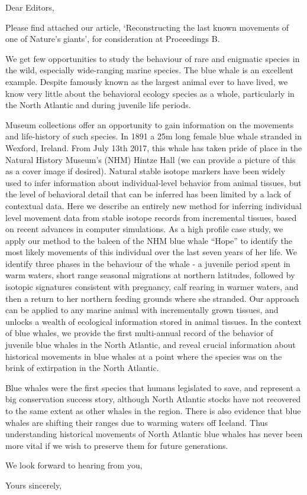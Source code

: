 \documentclass[11pt]{letter}
\begin{document}
\begin{letter}{}
\opening{Dear Editors,}

Please find attached our article, `Reconstructing the last known movements of one of Nature's giants', for consideration at Proceedings B.

We get few opportunities to study the behaviour of rare and enigmatic species in the wild, especially wide-ranging marine species. 
The blue whale is an excellent example. 
Despite famously known as the largest animal ever to have lived, we know very little about the behavioral ecology species as a whole, particularly in the North Atlantic and during juvenile life periods.

Museum collections offer an opportunity to gain information on the movements and life-history of such species. 
In 1891 a 25m long female blue whale stranded in Wexford, Ireland. 
From July 13th 2017, this whale has taken pride of place in the Natural History Museum's (NHM) Hintze Hall (we can provide a picture of this as a cover image if desired).
Natural stable isotope markers have been widely used to infer information about individual-level behavior from animal tissues, but the level of behavioral detail that can be inferred has been limited by a lack of contextual data. 
Here we describe an entirely new method for inferring individual level movement data from stable isotope records from incremental tissues, based on recent advances in computer simulations. 
As a high profile case study, we apply our method to the baleen of the NHM blue whale ``Hope'' to identify the most likely movements of this individual over the last seven years of her life. We identify three phases in the behaviour of the whale - a juvenile period spent in warm waters, short range seasonal migrations at northern latitudes, followed by isotopic signatures consistent with pregnancy, calf rearing in warmer waters, and then a return to her northern feeding grounds where she stranded. Our approach can be applied to any marine animal with incrementally grown tissues, and unlocks a wealth of ecological information stored in animal tissues. In the context of blue whales, we provide the first multi-annual record of the behavior of juvenile blue whales in the North Atlantic, and reveal crucial information about historical movements in blue whales at a point where the species was on the brink of extirpation in the North Atlantic.

Blue whales were the first species that humans legislated to save, and represent a big conservation success story, although North Atlantic stocks have not recovered to the same extent as other whales in the region. There is also evidence that blue whales are shifting their ranges due to warming waters off Iceland. Thus understanding historical movements of North Atlantic blue whales has never been more vital if we wish to preserve them for future generations.
 
We look forward to hearing from you,


\closing{Yours sincerely,}


\end{letter}
\end{document}

